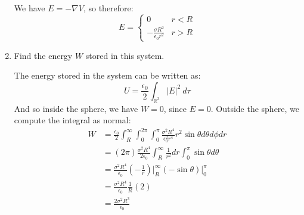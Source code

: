 \documentclass[10pt]{article}
\begin{document}
\begin{enumerate}[label=\alph*)]
					\begin{solution}
						We have $E = -\nabla V$, so therefore:
						\[ E = \begin{cases}
								0 & r < R\\
								-\frac{\sigma R^2}{\epsilon_0r^2} & r > R
						\end{cases}\]
					\end{solution}

			\item Find the energy $W$ stored in this system.

					\begin{solution}
							The energy stored in the system can be written as: 
							\[ U = \frac{\epsilon_0}{2}\int_{\mathbb R^3} |E|^2 \ d\tau\]
							And so inside the sphere, we have $W = 0$, since $E = 0$. Outside the sphere, we 
							compute the integral as normal:
							\begin{align*}
									W &= \frac{\epsilon_0}{2}\int_R^\infty \int_0^{2\pi} \int_0^\pi 
									\frac{\sigma^2 R^4}{\epsilon_0^2r^4} r^2 \sin \theta d \theta d\phi dr\\
									  &= (2\pi) \frac{\sigma^2R^4}{2\epsilon_0}\int_R^\infty \frac{1}{r^2} dr 
									  \int_0^\pi \sin \theta d \theta\\
									  &= \frac{\sigma^2 R^4}{\epsilon_0}\left( -\frac{1}{r} \right)\bigg|_R^\infty
									  (-\sin \theta)\bigg|_0^\pi\\
									  &= \frac{\sigma^2 R^4}{\epsilon_0}\frac{1}{R}(2)\\
									  &= \frac{2\sigma^2R^3}{\epsilon_0}
							\end{align*}
					\end{solution}
	\end{enumerate}

	\pagebreak
\end{document}
